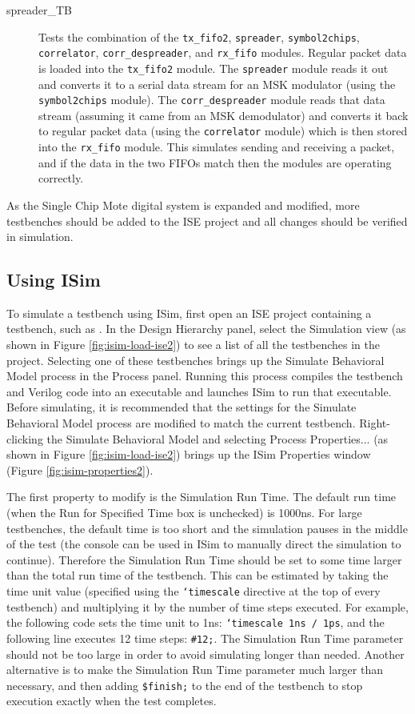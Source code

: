 \begin{description}
	\item[spreader\_TB] Tests the combination of the \texttt{tx\_fifo2}, \texttt{spreader}, \texttt{symbol2chips}, \texttt{correlator}, \texttt{corr\_despreader}, and \texttt{rx\_fifo} modules. Regular packet data is loaded into the \texttt{tx\_fifo2} module. The \texttt{spreader} module reads it out and converts it to a serial data stream for an MSK modulator (using the \texttt{symbol2chips} module). The \texttt{corr\_despreader} module reads that data stream (assuming it came from an MSK demodulator) and converts it back to regular packet data (using the \texttt{correlator} module) which is then stored into the \texttt{rx\_fifo} module. This simulates sending and receiving a packet, and if the data in the two FIFOs match then the modules are operating correctly.
\end{description}

As the Single Chip Mote digital system is expanded and modified, more testbenches should be added to the ISE project and all changes should be verified in simulation.

\subsection{Using ISim}
To simulate a testbench using ISim, first open an ISE project containing a testbench, such as . In the Design Hierarchy panel, select the Simulation view (as shown in Figure \ref{fig:isim-load-ise2}) to see a list of all the testbenches in the project. Selecting one of these testbenches brings up the Simulate Behavioral Model process in the Process panel. Running this process compiles the testbench and Verilog code into an executable and launches ISim to run that executable. Before simulating, it is recommended that the settings for the Simulate Behavioral Model process are modified to match the current testbench. Right-clicking the Simulate Behavioral Model and selecting Process Properties... (as shown in Figure \ref{fig:isim-load-ise2}) brings up the ISim Properties window (Figure \ref{fig:isim-properties2}).

The first property to modify is the Simulation Run Time. The default run time (when the Run for Specified Time box is unchecked) is 1000ns. For large testbenches, the default time is too short and the simulation pauses in the middle of the test (the console can be used in ISim to manually direct the simulation to continue). Therefore the Simulation Run Time should be set to some time larger than the total run time of the testbench. This can be estimated by taking the time unit value (specified using the \texttt{`timescale} directive at the top of every testbench) and multiplying it by the number of time steps executed. For example, the following code sets the time unit to 1ns: \texttt{`timescale 1ns / 1ps}, and the following line executes 12 time steps: \texttt{\#12;}. The Simulation Run Time parameter should not be too large in order to avoid simulating longer than needed. Another alternative is to make the Simulation Run Time parameter much larger than necessary, and then adding \texttt{\$finish;} to the end of the testbench to stop execution exactly when the test completes.


